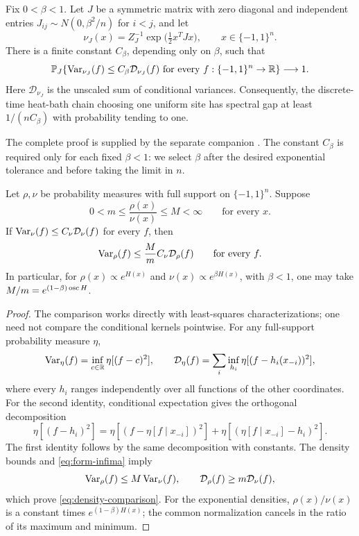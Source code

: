 \begin{theorem}
\label{thm:high-temperature-gap}
Fix $0<\beta<1$.  Let $J$ be a symmetric matrix with zero diagonal and
independent entries $J_{ij}\sim N(0,\beta^2/n)$ for $i<j$, and let
\[
 \nu_J(x)=Z_J^{-1}\exp\bigl(\tfrac12x^TJx\bigr),
 \qquad x\in\{-1,1\}^n.
\]
There is a finite constant $C_\beta$, depending only on $\beta$, such that
\[
 \mathbb P_J\!\left\{
   \operatorname{Var}_{\nu_J}(f)\le C_\beta\mathcal D_{\nu_J}(f)
   \text{ for every }f:\{-1,1\}^n\to\mathbb R
 \right\}\longrightarrow1.
\]
Here $\mathcal D_{\nu_J}$ is the unscaled sum of conditional variances.
Consequently, the discrete-time heat-bath chain choosing one uniform
site has spectral gap at least $1/(nC_\beta)$ with probability tending
to one.
\end{theorem}

The complete proof is supplied by the separate companion
\cite[Theorem~1.1]{skgapcompanion}. The constant $C_\beta$ is required
only for each fixed $\beta<1$: we select $\beta$ after the desired
exponential tolerance and before taking the limit in $n$.

\begin{lemma}
\label{lem:density-comparison}
Let $\rho,\nu$ be probability measures with full support on
$\{-1,1\}^n$.  Suppose
\[
 0<m\le\frac{\rho(x)}{\nu(x)}\le M<\infty
 \qquad\text{for every }x.
\]
If $\operatorname{Var}_\nu(f)\le C_\nu\mathcal D_\nu(f)$ for every $f$, then
\begin{equation}\label{eq:density-comparison}
 \operatorname{Var}_\rho(f)\le \frac{M}{m}C_\nu\mathcal D_\rho(f)
 \qquad\text{for every }f.
\end{equation}
In particular, for $\rho(x)\propto e^{H(x)}$ and
$\nu(x)\propto e^{\beta H(x)}$, with $\beta<1$, one may take
$M/m=e^{(1-\beta)\operatorname{osc} H}$.
\end{lemma}

\begin{proof}
The comparison works directly with least-squares characterizations;
one need not compare the conditional kernels pointwise. For any
full-support probability measure $\eta$,
\begin{equation}\label{eq:form-infima}
 \operatorname{Var}_\eta(f)=\inf_{c\in\mathbb R}\eta[(f-c)^2],
 \qquad
 \mathcal D_\eta(f)
 =\sum_i\inf_{h_i}\eta[(f-h_i(x_{-i}))^2],
\end{equation}
where every $h_i$ ranges independently over all functions of the other
coordinates.  For the second identity, conditional expectation gives
the orthogonal decomposition
\[
 \eta[(f-h_i)^2]
 =\eta[(f-\eta[f\mid x_{-i}])^2]
  +\eta[(\eta[f\mid x_{-i}]-h_i)^2].
\]
The first identity follows by the same decomposition with constants.
The density bounds and \eqref{eq:form-infima} imply
\[
 \operatorname{Var}_\rho(f)\le M\operatorname{Var}_\nu(f),
 \qquad
 \mathcal D_\rho(f)\ge m\mathcal D_\nu(f),
\]
which prove \eqref{eq:density-comparison}.  For the exponential
densities, $\rho(x)/\nu(x)$ is a constant times $e^{(1-\beta)H(x)}$;
the common normalization cancels in the ratio of its maximum and
minimum.
\end{proof}

